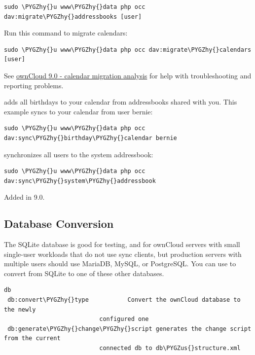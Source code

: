 \documentclass[letterpaper,10pt,english]{sphinxmanual}
\def\PYGZus{\char`\_}
\def\PYGZhy{\char`\-}
\begin{document}
\begin{Verbatim}[commandchars=\\\{\}]
sudo \PYGZhy{}u www\PYGZhy{}data php occ dav:migrate\PYGZhy{}addressbooks [user]
\end{Verbatim}

Run this command to migrate calendars:

\begin{Verbatim}[commandchars=\\\{\}]
sudo \PYGZhy{}u www\PYGZhy{}data php occ dav:migrate\PYGZhy{}calendars [user]
\end{Verbatim}

See \href{http://morrisjobke.de/2016/03/07/ownCloud-9.0-calendar-migration-analysis/}{ownCloud 9.0 - calendar migration analysis}
for help with troubleshooting and reporting problems.

 adds all birthdays to your calendar from
addressbooks shared with you. This example syncs to your calendar from user
bernie:

\begin{Verbatim}[commandchars=\\\{\}]
sudo \PYGZhy{}u www\PYGZhy{}data php occ dav:sync\PYGZhy{}birthday\PYGZhy{}calendar bernie
\end{Verbatim}

 synchronizes all users to the system
addressbook:

\begin{Verbatim}[commandchars=\\\{\}]
sudo \PYGZhy{}u www\PYGZhy{}data php occ dav:sync\PYGZhy{}system\PYGZhy{}addressbook
\end{Verbatim}

Added in 9.0.


\subsection{Database Conversion}
\label{configuration_server/occ_command:database-conversion}\label{configuration_server/occ_command:database-conversion-label}
The SQLite database is good for testing, and for ownCloud servers with small
single-user workloads that do not use sync clients, but production servers with
multiple users should use MariaDB, MySQL, or PostgreSQL. You can use  to
convert from SQLite to one of these other databases.

\begin{Verbatim}[commandchars=\\\{\}]
db
 db:convert\PYGZhy{}type           Convert the ownCloud database to the newly
                           configured one
 db:generate\PYGZhy{}change\PYGZhy{}script generates the change script from the current
                           connected db to db\PYGZus{}structure.xml
\end{Verbatim}
\end{document}
